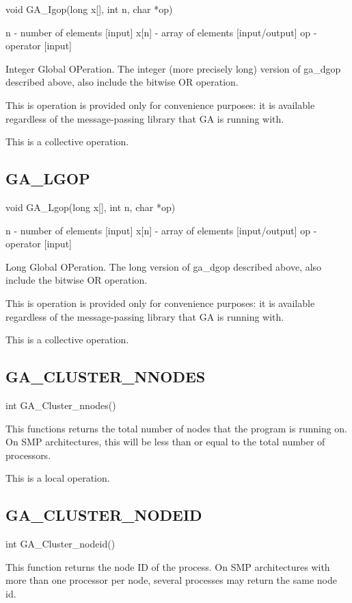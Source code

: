 void GA\_Igop(long x{[}{]}, int n, char {*}op)

n - number of elements {[}input{]} x{[}n{]} - array of elements {[}input/output{]}
op - operator {[}input{]}

Integer Global OPeration. The integer (more precisely long) version
of ga\_dgop described above, also include the bitwise OR operation.

This is operation is provided only for convenience purposes: it is
available regardless of the message-passing library that GA is running
with.

This is a collective operation. 


\subsection*{GA\_LGOP}

void GA\_Lgop(long x{[}{]}, int n, char {*}op)

n - number of elements {[}input{]} x{[}n{]} - array of elements {[}input/output{]}
op - operator {[}input{]}

Long Global OPeration. The long version of ga\_dgop described above,
also include the bitwise OR operation.

This is operation is provided only for convenience purposes: it is
available regardless of the message-passing library that GA is running
with.

This is a collective operation. 


\subsection*{GA\_CLUSTER\_NNODES}

int GA\_Cluster\_nnodes()

This functions returns the total number of nodes that the program
is running on. On SMP architectures, this will be less than or equal
to the total number of processors.

This is a local operation. 


\subsection*{GA\_CLUSTER\_NODEID}

int GA\_Cluster\_nodeid()

This function returns the node ID of the process. On SMP architectures
with more than one processor per node, several processes may return
the same node id.

